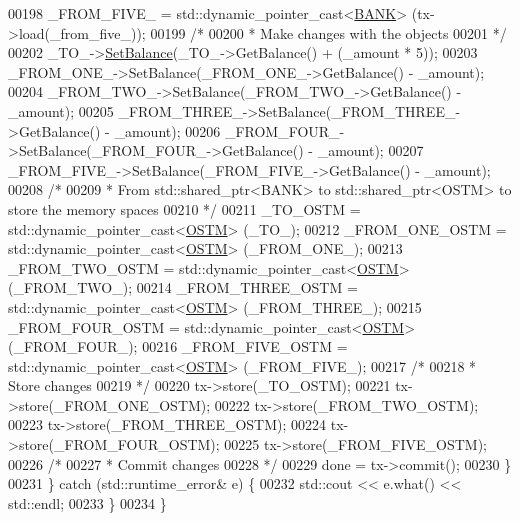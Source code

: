 \begin{DoxyCode}
00198             \_FROM\_FIVE\_ = std::dynamic\_pointer\_cast<\hyperlink{class_b_a_n_k}{BANK}> (tx->load(\_from\_five\_));
00199             \textcolor{comment}{/*}
00200 \textcolor{comment}{             * Make changes with the objects}
00201 \textcolor{comment}{             */}
00202             \_TO\_->\hyperlink{class_b_a_n_k_ae3e45b407bf8ec7175662442ea24b7c0_ae3e45b407bf8ec7175662442ea24b7c0}{SetBalance}(\_TO\_->GetBalance() + (\_amount * 5));
00203             \_FROM\_ONE\_->SetBalance(\_FROM\_ONE\_->GetBalance() - \_amount);
00204             \_FROM\_TWO\_->SetBalance(\_FROM\_TWO\_->GetBalance() - \_amount);
00205             \_FROM\_THREE\_->SetBalance(\_FROM\_THREE\_->GetBalance() - \_amount);
00206             \_FROM\_FOUR\_->SetBalance(\_FROM\_FOUR\_->GetBalance() - \_amount);
00207             \_FROM\_FIVE\_->SetBalance(\_FROM\_FIVE\_->GetBalance() - \_amount);
00208             \textcolor{comment}{/*}
00209 \textcolor{comment}{             * From std::shared\_ptr<BANK> to std::shared\_ptr<OSTM> to store the memory spaces}
00210 \textcolor{comment}{             */}
00211             \_TO\_OSTM = std::dynamic\_pointer\_cast<\hyperlink{class_o_s_t_m}{OSTM}> (\_TO\_);
00212             \_FROM\_ONE\_OSTM = std::dynamic\_pointer\_cast<\hyperlink{class_o_s_t_m}{OSTM}> (\_FROM\_ONE\_);
00213             \_FROM\_TWO\_OSTM = std::dynamic\_pointer\_cast<\hyperlink{class_o_s_t_m}{OSTM}> (\_FROM\_TWO\_);
00214             \_FROM\_THREE\_OSTM = std::dynamic\_pointer\_cast<\hyperlink{class_o_s_t_m}{OSTM}> (\_FROM\_THREE\_);
00215             \_FROM\_FOUR\_OSTM = std::dynamic\_pointer\_cast<\hyperlink{class_o_s_t_m}{OSTM}> (\_FROM\_FOUR\_);
00216             \_FROM\_FIVE\_OSTM = std::dynamic\_pointer\_cast<\hyperlink{class_o_s_t_m}{OSTM}> (\_FROM\_FIVE\_);
00217             \textcolor{comment}{/*}
00218 \textcolor{comment}{             * Store changes}
00219 \textcolor{comment}{             */}
00220             tx->store(\_TO\_OSTM);
00221             tx->store(\_FROM\_ONE\_OSTM);
00222             tx->store(\_FROM\_TWO\_OSTM);
00223             tx->store(\_FROM\_THREE\_OSTM);
00224             tx->store(\_FROM\_FOUR\_OSTM);
00225             tx->store(\_FROM\_FIVE\_OSTM);
00226             \textcolor{comment}{/*}
00227 \textcolor{comment}{             * Commit changes}
00228 \textcolor{comment}{             */}
00229             done = tx->commit();
00230         \}
00231     \} \textcolor{keywordflow}{catch} (std::runtime\_error& e) \{
00232         std::cout << e.what() << std::endl;
00233     \}
00234 \}
\end{DoxyCode}


